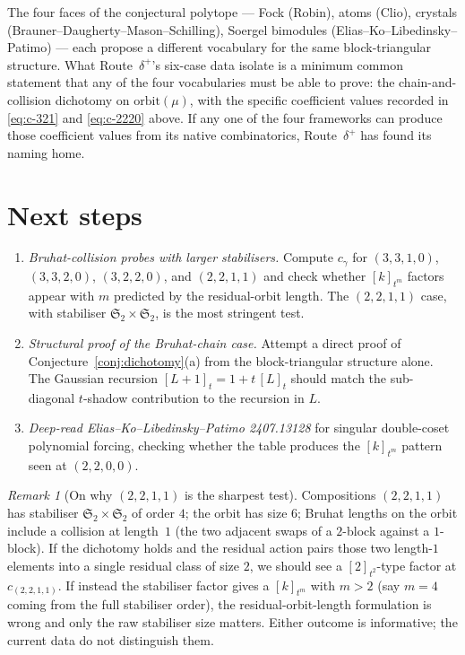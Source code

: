 \documentclass[11pt]{article}
\theoremstyle{definition}
\theoremstyle{remark}
\newtheorem{remark}[theorem]{Remark}
\newcommand{\qint}[1]{[#1]_t}
\begin{document}
The four faces of the conjectural polytope --- Fock (Robin),
atoms (Clio), crystals (Brauner--Daugherty--Mason--Schilling),
Soergel bimodules (Elias--Ko--Libedinsky--Patimo) --- each
propose a different vocabulary for the same block-triangular
structure. What Route~$\delta^+$'s six-case data isolate is a
minimum common statement that any of the four vocabularies must
be able to prove: the chain-and-collision dichotomy on
$\mathrm{orbit}(\mu)$, with the specific coefficient values
recorded in \eqref{eq:c-321} and \eqref{eq:c-2220} above. If any
one of the four frameworks can produce those coefficient values
from its native combinatorics, Route~$\delta^+$ has found its
naming home.

\section{Next steps}

\begin{enumerate}
\item \emph{Bruhat-collision probes with larger stabilisers.}
      Compute $c_\gamma$ for $(3,3,1,0)$, $(3,3,2,0)$, $(3,2,2,0)$,
      and $(2,2,1,1)$ and check whether $[k]_{t^m}$ factors appear
      with $m$ predicted by the residual-orbit length. The
      $(2,2,1,1)$ case, with stabiliser
      $\mathfrak{S}_2 \times \mathfrak{S}_2$, is the most stringent
      test.
\item \emph{Structural proof of the Bruhat-chain case.} Attempt a
      direct proof of Conjecture~\ref{conj:dichotomy}(a) from the
      block-triangular structure alone. The Gaussian recursion
      $\qint{L+1} = 1 + t\,\qint{L}$ should match the sub-diagonal
      $t$-shadow contribution to the recursion in $L$.
\item \emph{Deep-read Elias--Ko--Libedinsky--Patimo 2407.13128}
      for singular double-coset polynomial forcing, checking
      whether the table produces the $[k]_{t^m}$ pattern seen at
      $(2,2,0,0)$.
\end{enumerate}

\begin{remark}[On why $(2,2,1,1)$ is the sharpest test]
Compositions $(2,2,1,1)$ has stabiliser $\mathfrak{S}_2 \times
\mathfrak{S}_2$ of order $4$; the orbit has size $6$; Bruhat
lengths on the orbit include a collision at length~$1$ (the two
adjacent swaps of a $2$-block against a $1$-block). If the
dichotomy holds and the residual action pairs those two length-$1$
elements into a single residual class of size $2$, we should see a
$[2]_{t^2}$-type factor at $c_{(2,2,1,1)}$. If instead the
stabiliser factor gives a $[k]_{t^m}$ with $m > 2$ (say $m = 4$
coming from the full stabiliser order), the residual-orbit-length
formulation is wrong and only the raw stabiliser size matters.
Either outcome is informative; the current data do not
distinguish them.
\end{remark}
\end{document}
